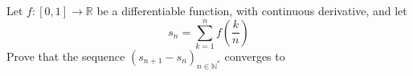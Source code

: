 Let $f:[0,1]\rightarrow{\mathbb{R}}$ be a differentiable function, with continuous derivative, and let
\[ s_{n}=\sum_{k=1}^{n}f\left(  \frac{k}{n}\right) \]
Prove that the sequence $(s_{n+1}-s_{n})_{n\in{\mathbb{N}}^{\ast}}$ converges to 